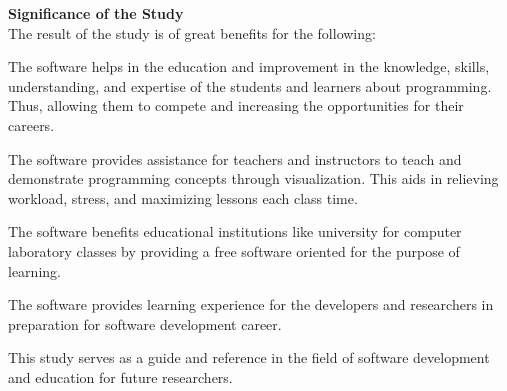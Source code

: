 \flushleft
\textbf{Significance of the Study}\\
\justifying
\parx
The result of the study is of great benefits for the following:

\parx
The software helps in the education and improvement in the knowledge,
skills, understanding, and expertise of the students and learners about
programming. Thus, allowing them to compete and increasing the opportunities for
their careers.

\parx
The software provides assistance for teachers and instructors to teach and
demonstrate programming concepts through visualization. This aids in
relieving workload, stress, and maximizing lessons each class time.

\parx
The software benefits educational institutions like university for computer
laboratory classes by providing a free software oriented for the purpose of
learning.

\parx
The software provides learning experience for the developers and researchers
in preparation for software development career.

\parx
This study serves as a guide and reference in the field of software
development and education for future researchers.\\
